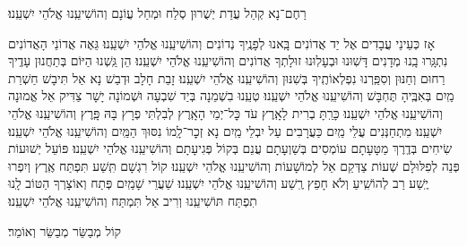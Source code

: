 \documentclass[twoside, openany, parskip=half, 11pt]{book}
\begin{document}
\begin{large}רַחֶם־נָא קְהַל עֲדַת יְשֻׁרוּן סְלַח וּמְחַל עֲוֹנָם וְהוֹשִׁיעֵֽנוּ אֱלֹהֵי יִשְׁעֵֽנוּ׃\end{large}

\begin{small}
אָז כְּעֵינֵי עֲבָדִים אֶל יַד אֲדוֹנִים בָּֽאנוּ לְפָנֶֽיךָ נְדוֹנִים וְהוֹשִׁיעֵֽנוּ אֱלֹהֵי יִשְׁעֵֽנוּ׃
גֵּאֶה אֲדוֹנֵי הָאֲדוֹנִים נִתְגָּֽרוּ בָֽנוּ מְדָנִים דָּשֽׁוּנוּ וּבְעָלֽוּנוּ זוּלָתְךָ אֲדוֹנִים וְהוֹשִׁיעֵֽנוּ אֱלֹהֵי יִשְׁעֵֽנוּ׃
הֵן גַּֽשְׁנוּ הַיּוֹם בְּתַחֲנוּן עָדֶֽיךָ רַחוּם וְחַנּוּן וְסִפַּֽרְנוּ נִפְלְאוֹתֶֽיךָ בְּשִׁנּוּן וְהוֹשִׁיעֵֽנוּ אֱלֹהֵי יִשְׁעֵֽנוּ׃
זָבַת חָלָב וּדְבַשׁ נָא אַל תִּיבָשׁ חַשְׁרַת מַֽיִם בְּאִבֶּֽיהָ תֶּחְבָּשׁ וְהוֹשִׁיעֵֽנוּ אֱלֹהֵי יִשְׁעֵֽנוּ׃
טְעֵֽנוּ בִשְׁמֵנָה בְּיַד שִׁבְעָה וּשְׁמוֹנָה יָשָׁר צַדִּיק אֵל אֱמוּנָה וְהוֹשִׁיעֵֽנוּ אֱלֹהֵי יִשְׁעֵֽנוּ׃
כָּרַֽתָּ בְרִית לָאָֽרֶץ עֹד כׇּל־יְמֵי הָאָֽרֶץ לְבִלְתִּי פְרָץ בָּהּ פָּֽרֶץ וְהוֹשִׁיעֵֽנוּ אֱלֹהֵי יִשְׁעֵֽנוּ׃
מִתְחַנְּנִים עֲלֵי מַֽיִם כַּעֲרָבִים עַל יִבְלֵי מַֽיִם נָא זְכׇר־לָֽמוֹ נִסּוּךְ הַמַּֽיִם וְהוֹשִׁיעֵֽנוּ אֱלֹהֵי יִשְׁעֵֽנוּ׃
שִׂיחִים בְּדֶֽרֶךְ מַטָּעָתָם עוֹמְסִים בְּשַׁוְעָתָם עֲנֵם בְּקוֹל פְּגִיעָתָם וְהוֹשִׁיעֵֽנוּ אֱלֹהֵי יִשְׁעֵֽנוּ׃
פּוֹעֵל יְשׁוּעוֹת פְּנֵה לְפִלּוּלָם שְׁעוֹת צַדְּקֵם אֵל לְמוֹשָׁעוֹת וְהוֹשִׁיעֵֽנוּ אֱלֹהֵי יִשְׁעֵֽנוּ׃
קוֹל רִגְשָׁם תִּֽשַׁע תִּפְתַּח אֶֽרֶץ וְיִפְרוּ יֶֽשַׁע רַב לְהוֹשִֽׁיעַ וְלֹא חָפֵץ רֶֽשַׁע וְהוֹשִׁיעֵֽנוּ אֱלֹהֵי יִשְׁעֵֽנוּ׃
שַׁעֲרֵי שָׁמַֽיִם פְּתַח וְאוֹצָרְךָ הַטּוֹב לָֽנוּ תִפְתַּח תּוֹשִׁיעֵֽנוּ וְרִיב אַל תִּמְתַּח וְהוֹשִׁיעֵֽנוּ אֱלֹהֵי יִשְׁעֵֽנוּ׃

\end{small}

\begin{large}קוֹל מְבַשֵּׂר מְבַשֵּׂר וְאוֹמֵר׃\end{large}
\end{document}
